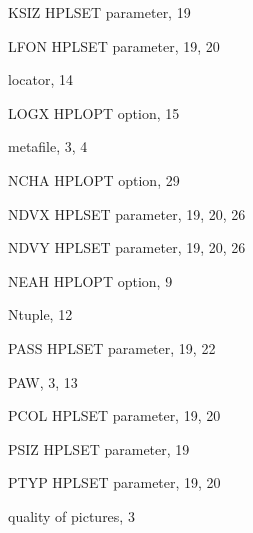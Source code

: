 \begin{theindex}
  \indexspace
 
  \item KSIZ
    \subitem HPLSET parameter, 19
 
  \indexspace
 
  \item LFON
    \subitem HPLSET parameter, 19, 20
  \item locator, 14
  \item LOGX
    \subitem HPLOPT option, 15
 
  \indexspace
 
  \item metafile, 3, 4
 
  \indexspace
 
  \item NCHA
    \subitem HPLOPT option, 29
  \item NDVX
    \subitem HPLSET parameter, 19, 20, 26
  \item NDVY
    \subitem HPLSET parameter, 19, 20, 26
  \item NEAH
    \subitem HPLOPT option, 9
  \item Ntuple, 12
 
  \indexspace
 
  \item PASS
    \subitem HPLSET parameter, 19, 22
  \item PAW, 3, 13
  \item PCOL
    \subitem HPLSET parameter, 19, 20
  \item PSIZ
    \subitem HPLSET parameter, 19
  \item PTYP
    \subitem HPLSET parameter, 19, 20
 
  \indexspace
 
  \item quality
    \subitem of pictures, 3
 
  \indexspace
 

\end{theindex}
